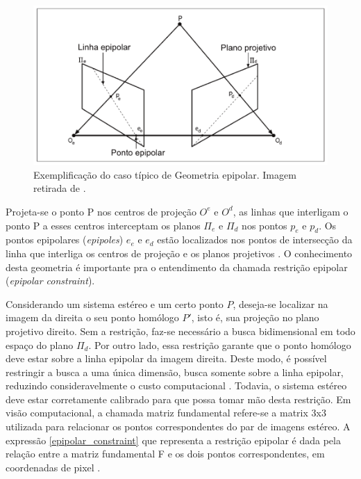 \begin{figure}[H]
 	\centering
 	\includegraphics[scale=0.35]{./Resources/bradski/geometry_epipolar.png}
 	\caption{Exemplificação do caso típico de Geometria epipolar. Imagem retirada de \cite{Mendes2012}.}
 	\label{geometry_epipolar}
\end{figure}

Projeta-se o ponto P nos centros de projeção $O^e$ e $O^d$, as linhas que interligam o ponto P a esses centros interceptam os planos $\Pi_e$ e $\Pi_d$ nos pontos $p_e$ e $p_d$. Os pontos epipolares (\textit{epipoles}) $e_e$ e $e_d$ estão localizados nos pontos de intersecção da linha que interliga os centros de projeção e os planos projetivos \cite{Mendes2012}. O conhecimento desta geometria é importante pra o entendimento da chamada restrição epipolar (\textit{epipolar constraint}).

Considerando um sistema estéreo e um certo ponto $P$, deseja-se localizar na imagem da direita o seu ponto homólogo $P'$, isto é, sua projeção no plano projetivo direito. Sem a restrição, faz-se necessário a busca bidimensional em todo espaço do plano $\Pi_d$. Por outro lado, essa restrição garante que o ponto homólogo deve estar sobre a linha epipolar da imagem direita. Deste modo, é possível restringir a busca a uma única dimensão, busca somente sobre a linha epipolar, reduzindo consideravelmente o custo computacional \cite{Bradski2008}. Todavia, o sistema estéreo deve estar corretamente calibrado para que possa tomar mão desta restrição. Em visão computacional, a chamada matriz fundamental refere-se a matrix 3x3 utilizada para relacionar os pontos correspondentes do par de imagens estéreo. A expressão \ref{epipolar_constraint} que representa a restrição epipolar é dada pela relação entre a matriz fundamental F e os dois pontos correspondentes, em coordenadas de pixel \cite{RobertLaganiere}.

